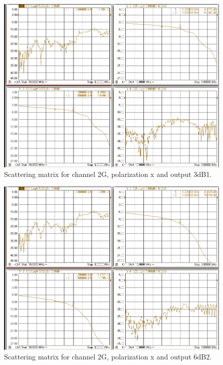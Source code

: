 \documentclass[12pt,a4paper,oneside]{article}
\begin{document}
\begin{figure}[H]
\centering
\includegraphics[width=0.9\linewidth]{VNA_results/2Gx_3dB1.png}
\caption{Scattering matrix for channel 2G, polarization x and output 3dB1.}
\label{fig:2Gx_3dB1}
\end{figure}


\begin{figure}[H]
\centering
\includegraphics[width=0.9\linewidth]{VNA_results/2Gx_6dB2.png}
\caption{Scattering matrix for channel 2G, polarization x and output 6dB2.}
\label{fig:2Gx_6dB2}
\end{figure}
\end{document}
